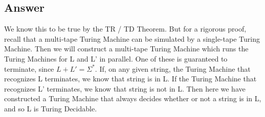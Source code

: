 \documentclass{article}
\begin{document}
\subsection*{Answer}
We know this to be true by the TR / TD Theorem. But for a rigorous proof, recall that a multi-tape Turing Machine can be simulated by
a single-tape Turing Machine. Then we will construct a multi-tape Turing Machine which runs the Turing Machines for L and L' in parallel. One of these
is guaranteed to terminate, since $L + L' = \Sigma^*$. If, on any given string, the Turing Machine that recognizes L terminates, 
we know that string is in L. If the Turing Machine that recognizes L' terminates, we know that string is not in L. Then here we have
constructed a Turing Machine that always decides whether or not a string is in L, and so L is Turing Decidable.
\end{document}
